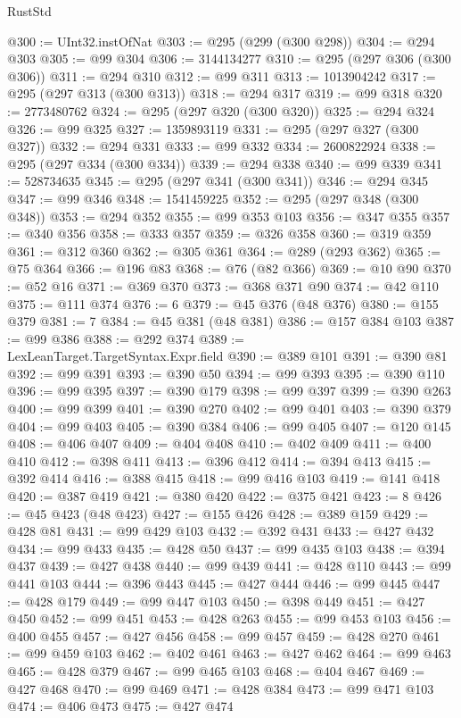 \begin{lexlean}{RustStd}
\begin{coremodule}
{\begin{coremodule}
{{{{{{{{{{{{{{{{{{{{{{{{{{{{{{{{{@300 := UInt32.instOfNat
@303 := @295 (@299 (@300 @298))
@304 := @294 @303
@305 := @99 @304
@306 := 3144134277
@310 := @295 (@297 @306 (@300 @306))
@311 := @294 @310
@312 := @99 @311
@313 := 1013904242
@317 := @295 (@297 @313 (@300 @313))
@318 := @294 @317
@319 := @99 @318
@320 := 2773480762
@324 := @295 (@297 @320 (@300 @320))
@325 := @294 @324
@326 := @99 @325
@327 := 1359893119
@331 := @295 (@297 @327 (@300 @327))
@332 := @294 @331
@333 := @99 @332
@334 := 2600822924
@338 := @295 (@297 @334 (@300 @334))
@339 := @294 @338
@340 := @99 @339
@341 := 528734635
@345 := @295 (@297 @341 (@300 @341))
@346 := @294 @345
@347 := @99 @346
@348 := 1541459225
@352 := @295 (@297 @348 (@300 @348))
@353 := @294 @352
@355 := @99 @353 @103
@356 := @347 @355
@357 := @340 @356
@358 := @333 @357
@359 := @326 @358
@360 := @319 @359
@361 := @312 @360
@362 := @305 @361
@364 := @289 (@293 @362)
@365 := @75 @364
@366 := @196 @83
@368 := @76 (@82 @366)
@369 := @10 @90
@370 := @52 @16
@371 := @369 @370
@373 := @368 @371 @90
@374 := @42 @110
@375 := @111 @374
@376 := 6
@379 := @45 @376 (@48 @376)
@380 := @155 @379
@381 := 7
@384 := @45 @381 (@48 @381)
@386 := @157 @384 @103
@387 := @99 @386
@388 := @292 @374
@389 := LexLeanTarget.TargetSyntax.Expr.field
@390 := @389 @101
@391 := @390 @81
@392 := @99 @391
@393 := @390 @50
@394 := @99 @393
@395 := @390 @110
@396 := @99 @395
@397 := @390 @179
@398 := @99 @397
@399 := @390 @263
@400 := @99 @399
@401 := @390 @270
@402 := @99 @401
@403 := @390 @379
@404 := @99 @403
@405 := @390 @384
@406 := @99 @405
@407 := @120 @145
@408 := @406 @407
@409 := @404 @408
@410 := @402 @409
@411 := @400 @410
@412 := @398 @411
@413 := @396 @412
@414 := @394 @413
@415 := @392 @414
@416 := @388 @415
@418 := @99 @416 @103
@419 := @141 @418
@420 := @387 @419
@421 := @380 @420
@422 := @375 @421
@423 := 8
@426 := @45 @423 (@48 @423)
@427 := @155 @426
@428 := @389 @159
@429 := @428 @81
@431 := @99 @429 @103
@432 := @392 @431
@433 := @427 @432
@434 := @99 @433
@435 := @428 @50
@437 := @99 @435 @103
@438 := @394 @437
@439 := @427 @438
@440 := @99 @439
@441 := @428 @110
@443 := @99 @441 @103
@444 := @396 @443
@445 := @427 @444
@446 := @99 @445
@447 := @428 @179
@449 := @99 @447 @103
@450 := @398 @449
@451 := @427 @450
@452 := @99 @451
@453 := @428 @263
@455 := @99 @453 @103
@456 := @400 @455
@457 := @427 @456
@458 := @99 @457
@459 := @428 @270
@461 := @99 @459 @103
@462 := @402 @461
@463 := @427 @462
@464 := @99 @463
@465 := @428 @379
@467 := @99 @465 @103
@468 := @404 @467
@469 := @427 @468
@470 := @99 @469
@471 := @428 @384
@473 := @99 @471 @103
@474 := @406 @473
@475 := @427 @474
}}}}}}}}}}}}}}}}}}}}}}}}}}}}}}}}}
\end{coremodule}}
\end{coremodule}
\end{lexlean}
